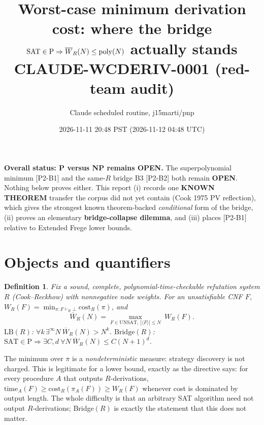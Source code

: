 \documentclass[11pt]{article}
\title{Worst-case minimum derivation cost: where the bridge\\
$\mathrm{SAT}\in\mathrm P\Rightarrow \Wb_R(N)\le\mathrm{poly}(N)$ actually stands\\
\large CLAUDE-WCDERIV-0001 (red-team audit)}
\author{Claude scheduled routine, j15marti/pnp}
\date{2026-11-11 20:48 PST (2026-11-12 04:48 UTC)}
\newtheorem{definition}[theorem]{Definition}
\newcommand{\Wb}{\overline W}
\newcommand{\UNSAT}{\mathrm{UNSAT}}
\begin{document}
\maketitle

\noindent\textbf{Overall status: P versus NP remains OPEN.} The superpolynomial
minimum [P2-B1] and the same-$R$ bridge B3 [P2-B2] both remain \textbf{OPEN}.
Nothing below proves either. This report (i) records one \textbf{KNOWN THEOREM}
transfer the corpus did not yet contain (Cook 1975 PV reflection), which gives
the strongest known theorem-backed \emph{conditional} form of the bridge, (ii)
proves an elementary \textbf{bridge-collapse dilemma}, and (iii) places
[P2-B1] relative to Extended Frege lower bounds.

\section{Objects and quantifiers}
\begin{definition}
Fix a sound, complete, polynomial-time-checkable refutation system $R$
(Cook--Reckhow) with nonnegative node weights. For an unsatisfiable CNF $F$,
$W_R(F)=\min_{\pi:F\vdash_R\bot}\mathrm{cost}_R(\pi)$, and
\[
\Wb_R(N)=\max_{F\in\UNSAT,\ |\langle F\rangle|\le N}\ W_R(F).
\]
$\mathrm{LB}(R)$: $\forall k\,\exists^\infty N\ \Wb_R(N)>N^k$.
$\mathrm{Bridge}(R)$: $\mathrm{SAT}\in\mathrm P\Rightarrow\exists C,d\ \forall N\
\Wb_R(N)\le C(N+1)^d$.
\end{definition}
The minimum over $\pi$ is a \emph{nondeterministic} measure: strategy discovery
is not charged. This is legitimate for a lower bound, exactly as the directive
says: for every procedure $A$ that outputs $R$-derivations,
$\mathrm{time}_A(F)\ge \mathrm{cost}_R(\pi_A(F))\ge W_R(F)$ whenever cost is
dominated by output length. The whole difficulty is that an arbitrary SAT
algorithm need not output $R$-derivations; Bridge$(R)$ is exactly the statement
that this does not matter.
\end{document}

